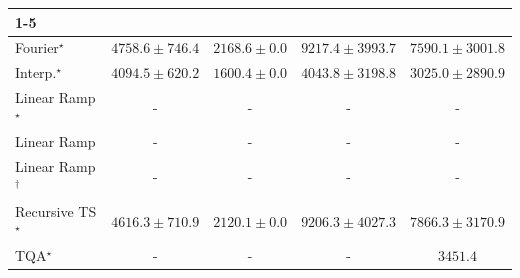 \begin{tabular}{l|cccc|}
\cline{1-5}
\multicolumn{5}{c}{\rule{0pt}{8pt}SV} \\
\midrule
Fourier$^\star$ & {\cellcolor[HTML]{96B6D7}} \color[HTML]{000000} $4758.6\pm 746.4$ & {\cellcolor[HTML]{F4EDF6}} \color[HTML]{000000} $2168.6\pm 0.0$ & {\cellcolor[HTML]{023858}} \color[HTML]{F1F1F1} $9217.4\pm 3993.7$ & {\cellcolor[HTML]{0569A5}} \color[HTML]{F1F1F1} $7590.1\pm 3001.8$ \\
Interp.$^\star$ & {\cellcolor[HTML]{B7C5DF}} \color[HTML]{000000} $4094.5\pm 620.2$ & {\cellcolor[HTML]{FFF7FB}} \color[HTML]{000000} $1600.4\pm 0.0$ & {\cellcolor[HTML]{B8C6E0}} \color[HTML]{000000} $4043.8\pm 3198.8$ & {\cellcolor[HTML]{DFDDEC}} \color[HTML]{000000} $3025.0\pm 2890.9$ \\
Linear Ramp$^\star$ & {\cellcolor[HTML]{000000}} \color[HTML]{F1F1F1} {\cellcolor{white}} \color{black} - & {\cellcolor[HTML]{000000}} \color[HTML]{F1F1F1} {\cellcolor{white}} \color{black} - & {\cellcolor[HTML]{000000}} \color[HTML]{F1F1F1} {\cellcolor{white}} \color{black} - & {\cellcolor[HTML]{000000}} \color[HTML]{F1F1F1} {\cellcolor{white}} \color{black} - \\
Linear Ramp & {\cellcolor[HTML]{000000}} \color[HTML]{F1F1F1} {\cellcolor{white}} \color{black} - & {\cellcolor[HTML]{000000}} \color[HTML]{F1F1F1} {\cellcolor{white}} \color{black} - & {\cellcolor[HTML]{000000}} \color[HTML]{F1F1F1} {\cellcolor{white}} \color{black} - & {\cellcolor[HTML]{000000}} \color[HTML]{F1F1F1} {\cellcolor{white}} \color{black} - \\
Linear Ramp$^\dagger$ & {\cellcolor[HTML]{000000}} \color[HTML]{F1F1F1} {\cellcolor{white}} \color{black} - & {\cellcolor[HTML]{000000}} \color[HTML]{F1F1F1} {\cellcolor{white}} \color{black} - & {\cellcolor[HTML]{000000}} \color[HTML]{F1F1F1} {\cellcolor{white}} \color{black} - & {\cellcolor[HTML]{000000}} \color[HTML]{F1F1F1} {\cellcolor{white}} \color{black} - \\
Recursive TS$^\star$ & {\cellcolor[HTML]{9EBAD9}} \color[HTML]{000000} $4616.3\pm 710.9$ & {\cellcolor[HTML]{F5EEF6}} \color[HTML]{000000} $2120.1\pm 0.0$ & {\cellcolor[HTML]{023858}} \color[HTML]{F1F1F1} $9206.3\pm 4027.3$ & {\cellcolor[HTML]{04639B}} \color[HTML]{F1F1F1} $7866.3\pm 3170.9$ \\
TQA$^\star$ & {\cellcolor[HTML]{000000}} \color[HTML]{F1F1F1} {\cellcolor{white}} \color{black} - & {\cellcolor[HTML]{000000}} \color[HTML]{F1F1F1} {\cellcolor{white}} \color{black} - & {\cellcolor[HTML]{000000}} \color[HTML]{F1F1F1} {\cellcolor{white}} \color{black} - & {\cellcolor[HTML]{D2D2E7}} \color[HTML]{000000} $3451.4$ \\

\end{tabular}
